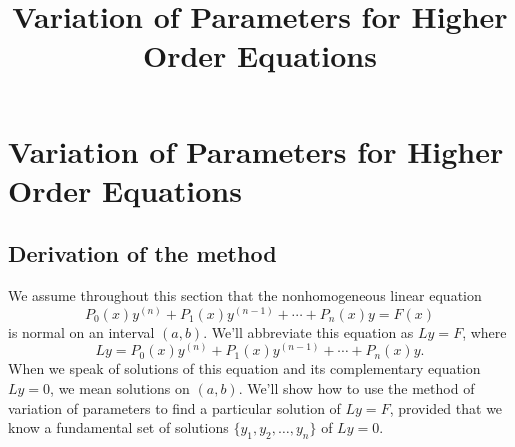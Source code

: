 \documentclass{ximera}
\title{Variation of Parameters for Higher Order Equations}%
\begin{document}
\begin{abstract}

\end{abstract}

\maketitle

\section*{Variation of Parameters for Higher Order Equations}

\subsection*{Derivation of the method}

We assume throughout this section that the nonhomogeneous linear equation
\begin{equation} \label{eq:9.4.1}
P_0(x)y^{(n)}+P_1(x)y^{(n-1)}+\cdots+P_n(x)y=F(x)
\end{equation}
is normal on an interval $(a,b)$. We'll abbreviate this equation as
$Ly=F$, where
$$
Ly=P_0(x)y^{(n)}+P_1(x)y^{(n-1)}+\cdots+P_n(x)y.
$$
When we speak of solutions of this equation and its complementary
equation $Ly=0$, we mean solutions on $(a,b)$. We'll show how to use
the method of variation of parameters to find a particular solution of
$Ly=F$, provided that we know a fundamental set of solutions
$\{y_1,y_2,\dots,y_n\}$ of $Ly=0$.
\end{document}
